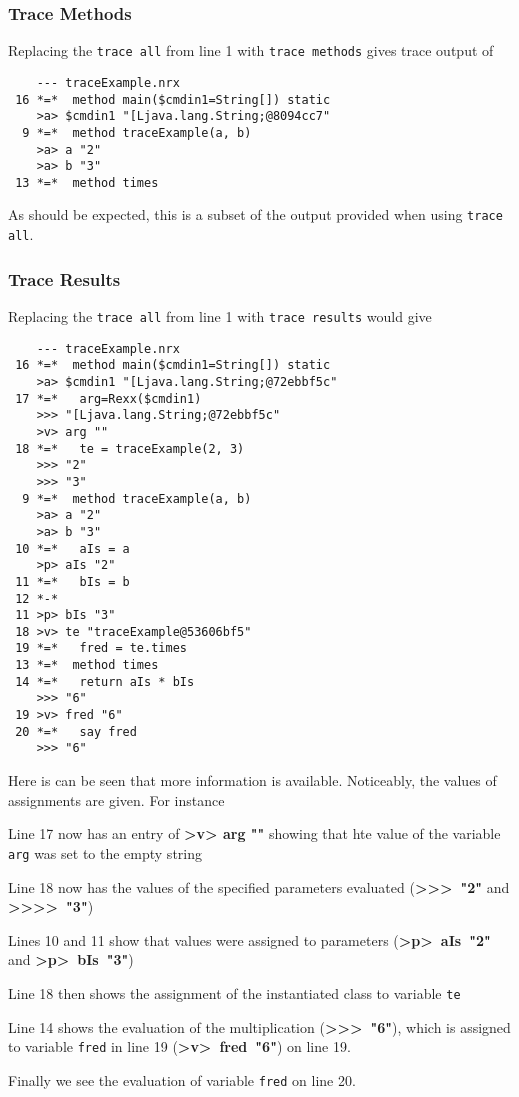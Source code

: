 {\subsubsection{Trace Methods}
Replacing the \texttt{trace all} from line 1 with \texttt{trace methods} gives trace output of
\begin{verbatim}
    --- traceExample.nrx 
 16 *=*  method main($cmdin1=String[]) static
    >a> $cmdin1 "[Ljava.lang.String;@8094cc7" 
  9 *=*  method traceExample(a, b)
    >a> a "2" 
    >a> b "3" 
 13 *=*  method times
\end{verbatim}
As should be expected, this is a subset of the output provided when using \texttt{trace all}.
\subsubsection{Trace Results}
Replacing the \texttt{trace all} from line 1 with \texttt{trace results} would give
\begin{verbatim}
    --- traceExample.nrx 
 16 *=*  method main($cmdin1=String[]) static
    >a> $cmdin1 "[Ljava.lang.String;@72ebbf5c" 
 17 *=*   arg=Rexx($cmdin1)
    >>> "[Ljava.lang.String;@72ebbf5c" 
    >v> arg "" 
 18 *=*   te = traceExample(2, 3)
    >>> "2" 
    >>> "3" 
  9 *=*  method traceExample(a, b)
    >a> a "2" 
    >a> b "3" 
 10 *=*   aIs = a
    >p> aIs "2" 
 11 *=*   bIs = b
 12 *-* 
 11 >p> bIs "3"
 18 >v> te "traceExample@53606bf5"
 19 *=*   fred = te.times
 13 *=*  method times
 14 *=*   return aIs * bIs
    >>> "6" 
 19 >v> fred "6"
 20 *=*   say fred
    >>> "6" 
\end{verbatim}
Here is can be seen that more information is available. Noticeably, the values of assignments are given.
For instance
\begin{description}
\item Line 17 now has an entry of \textbf{>v> arg ""} showing that hte value of the variable \texttt{arg} was set to the empty string
\item Line 18 now has the values of the specified parameters evaluated (\mbox{\textbf{\textgreater\textgreater> "2"}} and \mbox{\textbf{\textgreater\textgreater>> "3"}})
\item Lines 10 and 11 show that values were assigned to parameters (\mbox{\textbf{>p> aIs "2"}} and \mbox{\textbf{>p> bIs "3"})}
\item Line 18 then shows the assignment of the instantiated class to variable \texttt{te}
\item Line 14 shows the evaluation of the multiplication (\mbox{\textbf{\textgreater\textgreater> "6"}}), which is assigned to variable \texttt{fred} in line 19 (\mbox{\textbf{>v> fred "6"}}) on line 19.
\item Finally we see the evaluation of variable \texttt{fred} on line 20.
\end{description}
}
